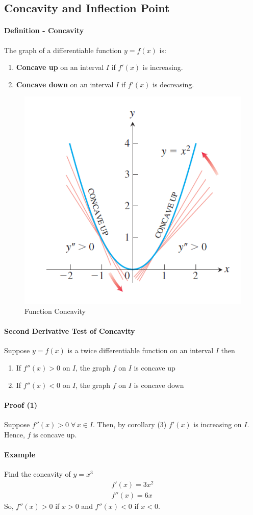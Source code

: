 \documentclass[12pt]{article}
\begin{document}
\subsection{Concavity and Inflection Point}
\paragraph{Definition - Concavity}
The graph of a differentiable function $y = f(x)$ is:
\begin{enumerate} 
     \item \textbf{Concave up} on an interval $I$ if $f'(x)$ is increasing.
     \item \textbf{Concave down} on an interval $I$ if $f'(x)$ is decreasing.
\end{enumerate}
\begin{figure}[h!]
     \centering
     \includegraphics[width = 0.4\linewidth]{Images/concavity.png}
     \caption{Function Concavity}
\end{figure}

\paragraph{Second Derivative Test of Concavity}
Suppose $y = f(x)$ is a twice differentiable function on an interval $I$ then
\begin{enumerate} 
     \item If $f''(x) > 0$ on $I$, the graph $f$ on $I$ is concave up 
     \item If $f''(x) < 0$ on $I$, the graph $f$ on $I$ is concave down
\end{enumerate}
\paragraph{Proof (1)}
Suppose $f''(x) > 0 \; \forall \, x \in I$. Then, by corollary (3) $f'(x)$ is increasing on $I$. Hence, $f$ is concave up.
\paragraph{Example} Find the concavity of $y = x^3$ 
\begin{align*} 
     f'(x) = 3x^2 \\
     f''(x) = 6x 
\end{align*}
So, $f''(x) > 0$ if $x > 0$ and $f''(x) < 0$ if $x < 0$.
\end{document}
